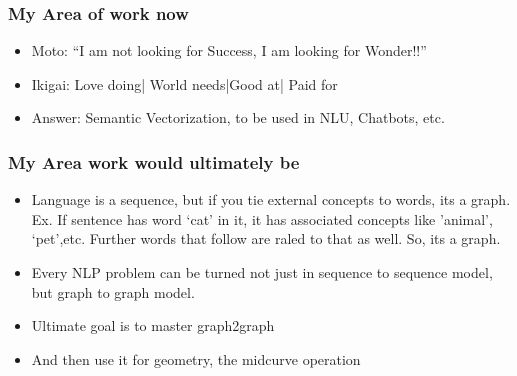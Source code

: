 \begin{frame}[fragile]\frametitle{My Area of work now}
\begin{itemize}
\item Moto: ``I am not looking for Success, I am looking for Wonder!!''
\item Ikigai: Love doing| World needs|Good at| Paid for
\item Answer: Semantic Vectorization, to be used in NLU, Chatbots, etc.
\end{itemize}
\end{frame}

\begin{frame}[fragile]\frametitle{My Area work would ultimately be}
\begin{itemize}
\item Language is a sequence, but if you tie external concepts to words, its a graph. Ex. If sentence has word `cat' in it, it has associated concepts like 'animal', `pet',etc. Further words that follow are raled to that as well. So, its a graph.
\item Every NLP problem can be turned not just in sequence to sequence model, but graph to graph model. 
\item Ultimate goal is to master graph2graph 
\item And then use it for geometry, the midcurve operation
\end{itemize}
\end{frame}

